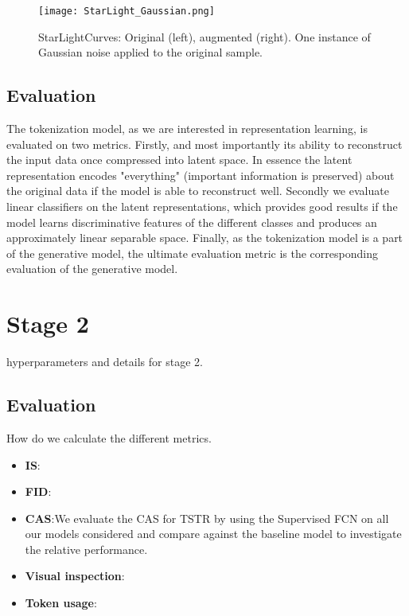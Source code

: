 \documentclass[../../thesis.tex]{subfiles}
\begin{document}
\begin{figure}[h]
    \texttt{[image: StarLight\_Gaussian.png]}
    \centering
    \caption{StarLightCurves: Original (left), augmented (right). One instance of Gaussian noise applied to the original sample.}
    \label{fig:StarLight_Gaussian}
\end{figure}

\subsection{Evaluation}

The tokenization model, as we are interested in representation learning, is evaluated on two metrics. Firstly, and most importantly its ability to reconstruct the input data once compressed into latent space. In essence the latent representation encodes "everything" (important information is preserved) about the original data if the model is able to reconstruct well. Secondly we evaluate linear classifiers on the latent representations, which provides good results if the model learns discriminative features of the different classes and produces an approximately linear separable space. Finally, as the tokenization model is a part of the generative model, the ultimate evaluation metric is the corresponding evaluation of the generative model. 



\section{Stage 2}

hyperparameters and details for stage 2.

\subsection{Evaluation}
How do we calculate the different metrics.


\begin{itemize}
    \item \textbf{IS}:
    \item \textbf{FID}:
    \item \textbf{CAS}:We evaluate the CAS for TSTR by using the Supervised FCN on all our models considered and compare against the baseline model to investigate the relative performance. 
    \item \textbf{Visual inspection}:
    \item \textbf{Token usage}:
\end{itemize}
\end{document}
